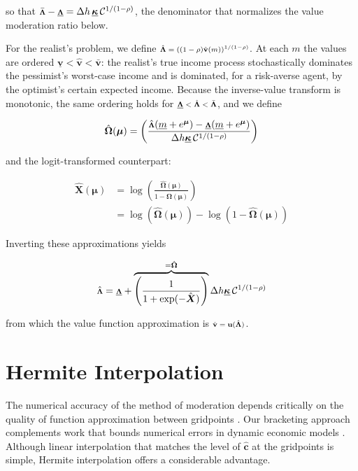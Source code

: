 \documentclass[preprint,authoryear]{elsarticle}
\newcommand{\CRRA}{\rho}
\newcommand{\hNrm}{h}
\newcommand{\MPC}{\boldsymbol{\kappa}}
\newcommand{\MPCmin}{\underline{\MPC}}
\newcommand{\mNrm}{m}
\newcommand{\cFunc}{\mathbf{c}}
\newcommand{\cFuncReal}{\hat{\cFunc}}
\newcommand{\hNrmEx}{\Delta \hNrm}
\newcommand{\mNrmMin}{\underline{\mNrm}}
\newcommand{\logmNrmEx}{\boldsymbol{\mu}}
\newcommand{\PDVCoverc}{\mathcal{C}}
\newcommand{\uFunc}{\mathbf{u}}
\newcommand{\vFunc}{\mathbf{v}}
\newcommand{\vFuncOpt}{\bar{\vFunc}}
\newcommand{\vInv}{{\scriptsize \boldsymbol{\Lambda}}}
\newcommand{\vInvOpt}{\bar{\vInv}}
\newcommand{\vInvPes}{\underline{\vInv}}
\newcommand{\vFuncReal}{\hat{\vFunc}}
\newcommand{\vInvReal}{\hat{\vInv}}
\newcommand{\vFuncPes}{\underline{\vFunc}}
\newcommand{\valModRte}{\boldsymbol{\Omega}}
\newcommand{\valModRteReal}{\hat{\valModRte}}
\newcommand{\logitValModRteReal}{\hat{\boldsymbol{X}}}
\begin{document}
so that $\vInvOpt - \vInvPes = \hNrmEx\,\MPCmin\,\PDVCoverc^{1/(1 -\CRRA)}$, the denominator that normalizes the value moderation ratio below.

For the realist's problem, we define $\vInvReal = \left((1 -\CRRA)\vFuncReal(\mNrm)\right)^{1/(1 -\CRRA)}$. At each $\mNrm$ the values are ordered $\vFuncPes < \vFuncReal < \vFuncOpt$: the realist's true income process stochastically dominates the pessimist's worst-case income and is dominated, for a risk-averse agent, by the optimist's certain expected income. Because the inverse-value transform is monotonic, the same ordering holds for $\vInvPes < \vInvReal < \vInvOpt$, and we define

\begin{equation}
\label{eq:valModRteReal}
\valModRteReal(\logmNrmEx) = \left(\frac{\vInvReal(\mNrmMin+e^{\logmNrmEx})-\vInvPes(\mNrmMin+e^{\logmNrmEx})}{\hNrmEx \MPCmin \,\PDVCoverc^{1/(1-\CRRA)}}\right)
\end{equation}

and the logit-transformed counterpart:

\begin{equation}
\label{eq:ChiUpper}
\begin{aligned}
\logitValModRteReal(\logmNrmEx) &= \log \left(\frac{\valModRteReal(\logmNrmEx)}{1-\valModRteReal(\logmNrmEx)}\right) \\
&= \log(\valModRteReal(\logmNrmEx)) - \log(1-\valModRteReal(\logmNrmEx))
\end{aligned}
\end{equation}

Inverting these approximations yields

\begin{equation}
\label{eq:vInvHi}
\vInvReal = \vInvPes+\overbrace{\left(\frac{1}{1+\exp(-\logitValModRteReal)}\right)}^{=\valModRteReal} \hNrmEx \MPCmin \,\PDVCoverc^{1/(1-\CRRA) }
\end{equation}

from which the value function approximation is $\vFuncReal = \uFunc(\vInvReal)$.

\section{Hermite Interpolation}

The numerical accuracy of the method of moderation depends critically on the quality of function approximation between gridpoints \citep{Santos2000}. Our bracketing approach complements work that bounds numerical errors in dynamic economic models \citep{JuddMaliarMaliar2017}. Although linear interpolation that matches the level of $\cFuncReal$ at the gridpoints is simple, Hermite interpolation \citep{Fritsch1980} offers a considerable advantage.
\end{document}

